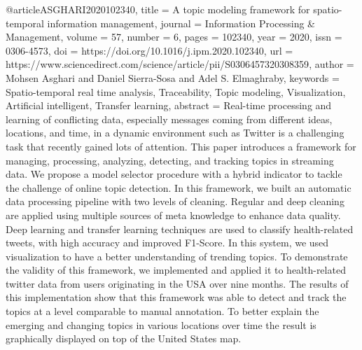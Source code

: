 @article{ASGHARI2020102340,
title = {A topic modeling framework for spatio-temporal information management},
journal = {Information Processing & Management},
volume = {57},
number = {6},
pages = {102340},
year = {2020},
issn = {0306-4573},
doi = {https://doi.org/10.1016/j.ipm.2020.102340},
url = {https://www.sciencedirect.com/science/article/pii/S0306457320308359},
author = {Mohsen Asghari and Daniel Sierra-Sosa and Adel S. Elmaghraby},
keywords = {Spatio-temporal real time analysis, Traceability, Topic modeling, Visualization, Artificial intelligent, Transfer learning},
abstract = {Real-time processing and learning of conflicting data, especially messages coming from different ideas, locations, and time, in a dynamic environment such as Twitter is a challenging task that recently gained lots of attention. This paper introduces a framework for managing, processing, analyzing, detecting, and tracking topics in streaming data. We propose a model selector procedure with a hybrid indicator to tackle the challenge of online topic detection. In this framework, we built an automatic data processing pipeline with two levels of cleaning. Regular and deep cleaning are applied using multiple sources of meta knowledge to enhance data quality. Deep learning and transfer learning techniques are used to classify health-related tweets, with high accuracy and improved F1-Score. In this system, we used visualization to have a better understanding of trending topics. To demonstrate the validity of this framework, we implemented and applied it to health-related twitter data from users originating in the USA over nine months. The results of this implementation show that this framework was able to detect and track the topics at a level comparable to manual annotation. To better explain the emerging and changing topics in various locations over time the result is graphically displayed on top of the United States map.}
}